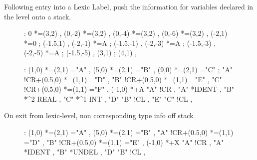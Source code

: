 \documentclass[a4paper,12pt]{article}
\begin{document}
Following entry into a Lexic Label, push the information for variables
declared in the level onto a stack.

\begin{figure}[h]

\xy <1cm,0cm>:
     0 *=(3,2)\frm{-} ,
(0,-2) *=(3,2)\frm{-} ,
(0,-4) *=(3,2)\frm{-} ,
(0,-6) *=(3,2)\frm{-} ,
\POS (-2,1)  *={0} \ar ; (-1.5,1) ,
\POS (-2,-1) *={A} \ar ; (-1.5,-1) ,
\POS (-2,-3) *={A} \ar ; (-1.5,-3) ,
\POS (-2,-5) *={A} \ar ; (-1.5,-5) ,
\POS (3,1) \ar ; (4,1) ,
\endxy

\end{figure}

\vspace{10mm}

\begin{figure}[h]

\xy <1cm,0cm>:
(1,0) *=(2,1)\frm{-} ="A" ,
(5,0) *=(2,1)\frm{-} ="B" ,
(9,0) *=(2,1)\frm{-} ="C" ; 
\POS "A" !CR+(0.5,0) *=(1,1)\frm{-} ="D" ,
\POS "B" !CR+(0.5,0) *=(1,1)\frm{-} ="E" ,
\POS "C" !CR+(0.5,0) *=(1,1)\frm{-} ="F" ,
\POS (-1,0) *+{A} \ar "A" !CR , 
\POS "A" *{IDENT} ,
\POS "B" *{^{2} REAL} ,
\POS "C" *{^{1} INT} ,
\POS "D"  \ar "B" !CL ,
\POS "E"  \ar "C" !CL ,
\endxy

\end{figure}

On exit from lexic-level, non corresponding type info off stack

\begin{figure}[h]

\xy <1cm,0cm>:
(1,0) *=(2,1)\frm{-} ="A" ,
(5,0) *=(2,1)\frm{-} ="B" ,
\POS "A" !CR+(0.5,0) *=(1,1)\frm{-} ="D" ,
\POS "B" !CR+(0.5,0) *=(1,1)\frm{-} ="E" ,
\POS (-1,0) *+{X} \ar "A" !CR , 
\POS "A" *{IDENT} ,
\POS "B" *{UNDEL} ,
\POS "D"  \ar "B" !CL ,
\endxy

\end{figure}

\vspace{20mm}
\end{document}
